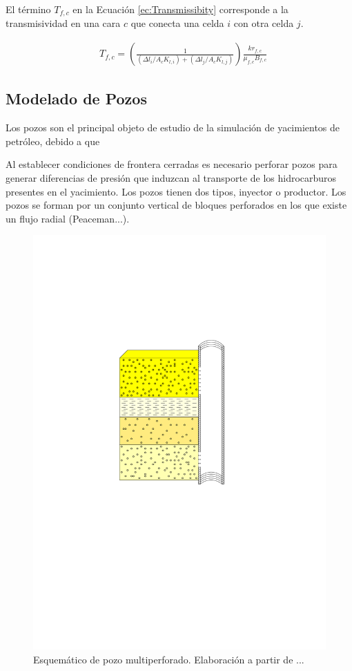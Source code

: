 El término $T_{f,c}$ en la Ecuación \ref{ec:Transmissibity} corresponde a la transmisividad en una cara $c$ que conecta una celda $i$ con otra celda $j$.

\begin{align}
	\label{ec:Transmissibity}& T_{f,c} = \left(\frac{1}{(\Delta l_{i}/A_{c}K_{l,i})+(\Delta l_{j}/A_{c}K_{l,j})}\right)\frac{kr_{f,c}}{\mu_{f,c}B_{f,c}}
\end{align}
\subsection{Modelado de Pozos}
%
Los pozos son el principal objeto de estudio de la simulación de yacimientos de petróleo, debido a que 

Al establecer condiciones de frontera cerradas es necesario perforar pozos para generar diferencias de presión que induzcan al transporte de los hidrocarburos presentes en el yacimiento. Los pozos tienen dos tipos, inyector o productor. Los pozos se forman por un conjunto vertical de bloques perforados en los que existe un flujo radial (Peaceman...).

\begin{figure}[h]
	\centering%
	\includegraphics[scale=0.8]{Fig/pozo_multi_perf.pdf}%
	\caption[Esquemático de pozo multiperforado.]{Esquemático de pozo multiperforado. Elaboración a partir de ...} \label{fig:mulperfwell}
\end{figure}

